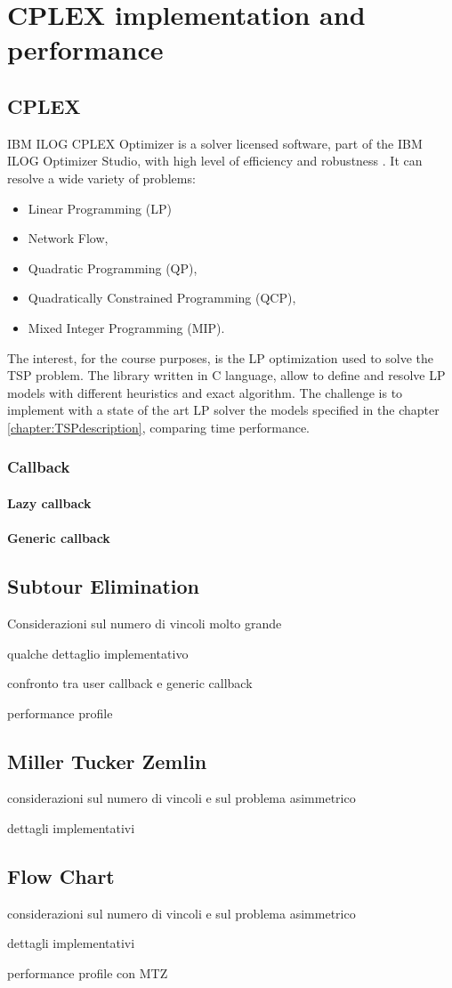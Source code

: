 \chapter{CPLEX implementation and performance}

\section{CPLEX}
IBM ILOG CPLEX Optimizer is a solver licensed software, part of the IBM ILOG Optimizer Studio, with high level of efficiency and robustness \cite{IBMILOGCPLEX}. It can resolve a wide variety of problems:
\begin{itemize}
	\item Linear Programming (LP)
	\item Network Flow,
	\item Quadratic Programming (QP),
	\item Quadratically Constrained Programming (QCP),
	\item Mixed Integer Programming (MIP).
\end{itemize}
The interest, for the course purposes, is the LP optimization used to solve the TSP problem. The library written in C language, allow to define and resolve LP models with different heuristics and exact algorithm. The challenge is to implement with a state of the art LP solver the models specified in the chapter \ref{chapter:TSPdescription}, comparing time performance. 

\subsection{Callback}
\subsubsection{Lazy callback}
\subsubsection{Generic callback}



\section{Subtour Elimination}\label{sec:subtour}

Considerazioni sul numero di vincoli molto grande

qualche dettaglio implementativo

confronto tra user callback e generic callback 

performance profile


\section{Miller Tucker Zemlin}

considerazioni sul numero di vincoli e sul problema asimmetrico

dettagli implementativi


\section{Flow Chart}

considerazioni sul numero di vincoli e sul problema asimmetrico

dettagli implementativi

performance profile con MTZ
